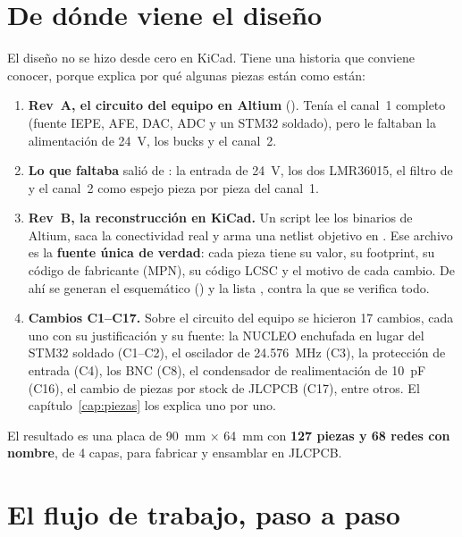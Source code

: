 \section{De dónde viene el diseño}\label{sec:c01-origen}

El diseño no se hizo desde cero en KiCad. Tiene una historia que conviene conocer, porque explica por qué algunas piezas están como están:

\begin{enumerate}
  \item \textbf{Rev~A, el circuito del equipo en Altium} (). Tenía el canal~1 completo (fuente IEPE, AFE, DAC, ADC y un STM32 soldado), pero le faltaban la alimentación de \SI{24}{\volt}, los bucks y el canal~2.
  \item \textbf{Lo que faltaba} salió de : la entrada de \SI{24}{\volt}, los dos LMR36015, el filtro de  y el canal~2 como espejo pieza por pieza del canal~1.
  \item \textbf{Rev~B, la reconstrucción en KiCad.} Un script lee los  binarios de Altium, saca la conectividad real y arma una netlist objetivo en . Ese archivo es la \textbf{fuente única de verdad}: cada pieza tiene su valor, su footprint, su código de fabricante (MPN), su código LCSC y el motivo de cada cambio. De ahí se generan el esquemático () y la lista , contra la que se verifica todo.
  \item \textbf{Cambios C1--C17.} Sobre el circuito del equipo se hicieron 17 cambios, cada uno con su justificación y su fuente: la NUCLEO enchufada en lugar del STM32 soldado (C1--C2), el oscilador de \SI{24.576}{\mega\hertz} (C3), la protección de entrada (C4), los BNC (C8), el condensador de realimentación de \SI{10}{\pico\farad} (C16), el cambio de piezas por stock de JLCPCB (C17), entre otros. El capítulo~\ref{cap:piezas} los explica uno por uno.
\end{enumerate}

El resultado es una placa de \SI{90}{\milli\meter} $\times$ \SI{64}{\milli\meter} con \textbf{127 piezas y 68 redes con nombre}, de 4 capas, para fabricar y ensamblar en JLCPCB.

\section{El flujo de trabajo, paso a paso}\label{sec:c01-flujo}

